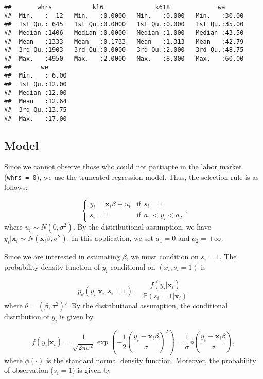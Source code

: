 \documentclass[
  12pt,
]{article}
\begin{document}
\begin{verbatim}
##       whrs           kl6              k618             wa       
##  Min.   :  12   Min.   :0.0000   Min.   :0.000   Min.   :30.00  
##  1st Qu.: 645   1st Qu.:0.0000   1st Qu.:0.000   1st Qu.:35.00  
##  Median :1406   Median :0.0000   Median :1.000   Median :43.50  
##  Mean   :1333   Mean   :0.1733   Mean   :1.313   Mean   :42.79  
##  3rd Qu.:1903   3rd Qu.:0.0000   3rd Qu.:2.000   3rd Qu.:48.75  
##  Max.   :4950   Max.   :2.0000   Max.   :8.000   Max.   :60.00  
##        we       
##  Min.   : 6.00  
##  1st Qu.:12.00  
##  Median :12.00  
##  Mean   :12.64  
##  3rd Qu.:13.75  
##  Max.   :17.00
\end{verbatim}

\hypertarget{model}{%
\subsection{Model}\label{model}}

Since we cannot observe those who could not partiapte in the labor
market (\texttt{whrs\ =\ 0}), we use the truncated regression model.
Thus, the selection rule is as follows:

\begin{equation*}
  \begin{cases}
    y_i = \mathbf{x}_i \beta + u_i &\text{if}\:\: s_i = 1  \\
    s_i = 1 &\text{if}\:\: a_1 < y_i < a_2
  \end{cases}.
\end{equation*} where \(u_i \sim N(0, \sigma^2)\). By the distributional
assumption, we have
\(y_i | \mathbf{x}_i \sim N(\mathbf{x}_i \beta, \sigma^2)\). In this
application, we set \(a_1 = 0\) and \(a_2 = +\infty\).

Since we are interested in estimating \(\beta\), we must condition on
\(s_i = 1\). The probability density function of \(y_i\) conditional on
\((x_i, s_i = 1)\) is

\begin{equation*}
  p_{\theta}(y_i | \mathbf{x}_i, s_i = 1) = \frac{f(y_i | \mathbf{x}_i)}{\mathbb{P}(s_i = 1 | \mathbf{x}_i)}.
\end{equation*} where \(\theta = (\beta, \sigma^2)'\). By the
distributional assumption, the conditional distribution of \(y_i\) is
given by

\begin{equation*}
  f(y_i | \mathbf{x}_i) 
  = \frac{1}{\sqrt{2\pi\sigma^2}} \exp \left( -\frac{1}{2} \left( \frac{y_i - \mathbf{x}_i \beta}{\sigma} \right)^2 \right)
  = \frac{1}{\sigma} \phi \left( \frac{y_i - \mathbf{x}_i \beta}{\sigma} \right),
\end{equation*} where \(\phi(\cdot)\) is the standard normal density
function. Moreover, the probability of observation (\(s_i = 1\)) is
given by
\end{document}
